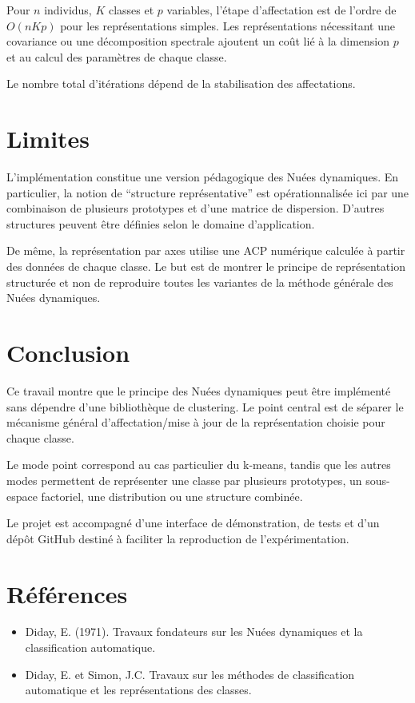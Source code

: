 \documentclass[12pt,a4paper]{article}
\begin{document}
Pour $n$ individus, $K$ classes et $p$ variables, l'étape d'affectation est de l'ordre de $O(nKp)$ pour les représentations simples. Les représentations nécessitant une covariance ou une décomposition spectrale ajoutent un coût lié à la dimension $p$ et au calcul des paramètres de chaque classe.

Le nombre total d'itérations dépend de la stabilisation des affectations.

\section{Limites}

L'implémentation constitue une version pédagogique des Nuées dynamiques. En particulier, la notion de ``structure représentative'' est opérationnalisée ici par une combinaison de plusieurs prototypes et d'une matrice de dispersion. D'autres structures peuvent être définies selon le domaine d'application.

De même, la représentation par axes utilise une ACP numérique calculée à partir des données de chaque classe. Le but est de montrer le principe de représentation structurée et non de reproduire toutes les variantes de la méthode générale des Nuées dynamiques.

\section{Conclusion}

Ce travail montre que le principe des Nuées dynamiques peut être implémenté sans dépendre d'une bibliothèque de clustering. Le point central est de séparer le mécanisme général d'affectation/mise à jour de la représentation choisie pour chaque classe.

Le mode point correspond au cas particulier du k-means, tandis que les autres modes permettent de représenter une classe par plusieurs prototypes, un sous-espace factoriel, une distribution ou une structure combinée.

Le projet est accompagné d'une interface de démonstration, de tests et d'un dépôt GitHub destiné à faciliter la reproduction de l'expérimentation.

\section*{Références}

\begin{itemize}
    \item Diday, E. (1971). Travaux fondateurs sur les Nuées dynamiques et la classification automatique.
    \item Diday, E. et Simon, J.C. Travaux sur les méthodes de classification automatique et les représentations des classes.
\end{itemize}
\end{document}
